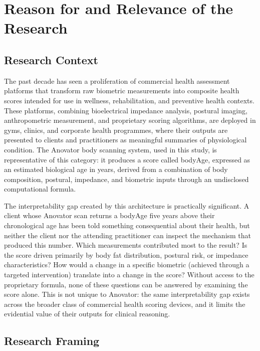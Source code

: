 \documentclass[11pt,a4paper]{report}
\begin{document}
\newpage

\chapter{Reason for and Relevance of the Research}

\section{Research Context}

The past decade has seen a proliferation of commercial health assessment platforms that transform
raw biometric measurements into composite health scores intended for use in wellness,
rehabilitation, and preventive health contexts. These platforms, combining bioelectrical
impedance analysis, postural imaging, anthropometric measurement, and proprietary scoring
algorithms, are deployed in gyms, clinics, and corporate health programmes, where their outputs
are presented to clients and practitioners as meaningful summaries of physiological condition. The
Anovator body scanning system, used in this study, is representative of this category: it produces
a score called bodyAge, expressed as an estimated biological age in years, derived from a
combination of body composition, postural, impedance, and biometric inputs through an undisclosed
computational formula.

The interpretability gap created by this architecture is practically significant. A client whose
Anovator scan returns a bodyAge five years above their chronological age has been told something
consequential about their health, but neither the client nor the attending practitioner can inspect
the mechanism that produced this number. Which measurements contributed most to the result? Is the
score driven primarily by body fat distribution, postural risk, or impedance characteristics? How
would a change in a specific biometric (achieved through a targeted intervention) translate
into a change in the score? Without access to the proprietary formula, none of these questions can
be answered by examining the score alone. This is not unique to Anovator: the same interpretability
gap exists across the broader class of commercial health scoring devices, and it limits the
evidential value of their outputs for clinical reasoning.

\section{Research Framing}
\end{document}
